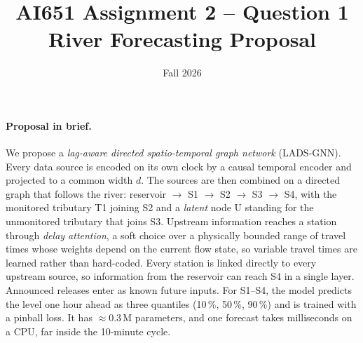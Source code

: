 \documentclass[11pt,a4paper]{article}
\title{AI651 Assignment 2 -- Question 1\\River Forecasting Proposal}
\date{Fall 2026}
\begin{document}
\maketitle

\paragraph{Proposal in brief.}
We propose a \emph{lag-aware directed spatio-temporal graph network} (LADS-GNN). Every data
source is encoded on its own clock by a causal temporal encoder and projected to a common
width $d$. The sources are then combined on a directed graph that follows the river: reservoir
$\to$ S1 $\to$ S2 $\to$ S3 $\to$ S4, with the monitored tributary T1 joining S2 and a
\emph{latent} node U standing for the unmonitored tributary that joins S3. Upstream information
reaches a station through \emph{delay attention}, a soft choice over a physically bounded range of
travel times whose weights depend on the current flow state, so variable travel times are learned
rather than hard-coded. Every station is linked directly to every upstream source, so information
from the reservoir can reach S4 in a single layer. Announced releases enter as known future inputs.
For S1--S4, the model predicts the level one hour ahead as three quantiles (10\,\%, 50\,\%, 90\,\%)
and is trained with a pinball loss. It has $\approx$0.3\,M parameters, and one forecast takes
milliseconds on a CPU, far inside the 10-minute cycle.





\end{document}
